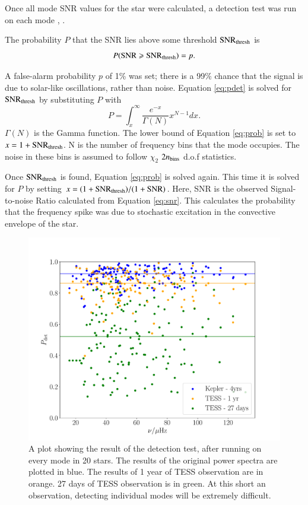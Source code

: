 \documentclass[a4paper,fleqn,usenatbib,useAMS]{mnras}
\begin{document}
Once all mode SNR values for the star were calculated, a detection test was run on each mode \citep{chaplin_predicting_2011}, \citep{campante_asteroseismic_2016}.

The probability $P$ that the SNR lies above some threshold ${\rm SNR_{thresh}}$ is
\begin{equation}
\label{eq:pdet}
{P \rm ({ SNR \geq SNR_{thresh}})} =  p .
\end{equation}

A false-alarm probability $p$ of 1\% was set; there is a 99\% chance that the signal is due to solar-like oscillations, rather than noise. Equation \ref{eq:pdet} is solved for $\rm SNR_{thresh}$ by substituting $P$ with
\begin{equation}
\label{eq:prob}
P = \int_{x}^{\infty} \frac{e^{-x}}{\Gamma(N)} x^{N-1} dx .
\end{equation}
$\Gamma(N)$ is the Gamma function. The lower bound of Equation \ref{eq:prob} is set to $x=1+{\rm SNR_{thresh}}$. N is the number of frequency bins that the mode occupies. The noise in these bins is assumed to follow $\chi_{2}$ $2n_{\rm bins}$ d.o.f statistics. 

Once $\rm SNR_{thresh}$ is found, Equation \ref{eq:prob} is solved again. This time it is solved for $P$ by setting $x=(1+{\rm SNR_{thresh}})/(1+{\rm SNR})$. Here, SNR is the observed Signal-to-noise Ratio calculated from Equation \ref{eq:snr}. This calculates the probability that the frequency spike was due to stochastic excitation in the convective envelope of the star.

\begin{figure}
	\centering
	\includegraphics[scale=0.3]{DetTest_Diagnostic_plot3.pdf}
	\caption{A plot showing the result of the detection test, after running on every mode in 20 stars. The results of the original power spectra are plotted in blue. The results of 1 year of TESS observation are in orange. 27 days of TESS observation is in green. At this short an observation, detecting individual modes will be extremely difficult.}	
	\label{fig: modes}
\end{figure}
\end{document}
